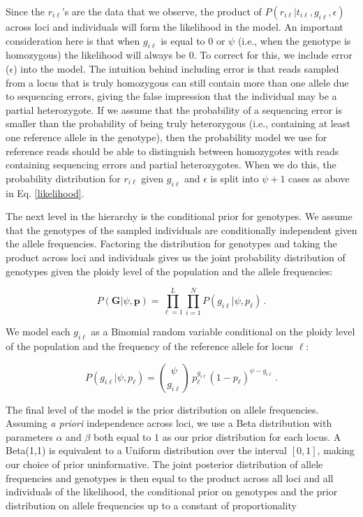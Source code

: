 \documentclass[11pt,english,letterpaper,oneside]{article}
\begin{document}
\noindent Since the $r_{i \ell}$'s are the data that we observe, the product of $P(r_{i \ell}|t_{i\ell}, g_{i \ell},\epsilon)$ across loci and individuals will form the likelihood in the model. An important consideration here is that when $g_{i \ell}$ is equal to 0 or $\psi$ (i.e., when the genotype is homozygous) the likelihood will always be 0. To correct for this, we include error ($\epsilon$) into the model. The intuition behind including error is that reads sampled from a locus that is truly homozygous can still contain more than one allele due to sequencing errors, giving the false impression that the individual may be a partial heterozygote. If we assume that the probability of a sequencing error is smaller than the probability of being truly heterozygous (i.e., containing at least one reference allele in the genotype), then the probability model we use for reference reads should be able to distinguish between homozygotes with reads containing sequencing errors and partial heterozygotes. When we do this, the probability distribution for $r_{i\ell}$ given $g_{i\ell}$ and $\epsilon$ is split into $\psi+1$ cases as above in Eq. \ref{likelihood}.
\medskip

The next level in the hierarchy is the conditional prior for genotypes. We assume that the genotypes of the sampled individuals are conditionally independent given the allele frequencies. Factoring the distribution for genotypes and taking the product across loci and individuals gives us the joint probability distribution of genotypes given the ploidy level of the population and the allele frequencies:

\begin{equation}\label{condl_prior}
P(\bm{G}|\psi, \bm{p}) = \displaystyle\prod_{\ell=1}^L\displaystyle\prod_{i=1}^N P(g_{i \ell}|\psi, p_{\ell})\,.
\end{equation}

\noindent We model each $g_{i \ell}$ as a Binomial random variable conditional on the ploidy level of the population and the frequency of the reference allele for locus $\ell$:

\begin{equation*}
P(g_{i \ell}|\psi,p_{\ell}) = \binom{\psi}{g_{i \ell}}\,p_{\ell}^{g_{i \ell}}(1-p_{\ell})^{\psi-g_{i \ell}}\,.
\end{equation*}

The final level of the model is the prior distribution on allele frequencies. Assuming \textit{a priori} independence across loci, we use a Beta distribution with parameters $\alpha$ and $\beta$ both equal to $1$ as our prior distribution for each locus. A Beta(1,1) is equivalent to a Uniform distribution over the interval $[0,1]$, making our choice of prior uninformative. The joint posterior distribution of allele frequencies and genotypes is then equal to the product across all loci and all individuals of the likelihood, the conditional prior on genotypes and the prior distribution on allele frequencies up to a constant of proportionality
\end{document}
